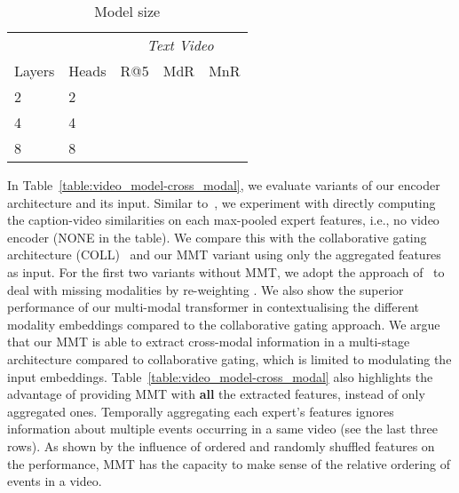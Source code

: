\documentclass[runningheads]{llncs}
\begin{document}
\begin{table}[t]
\begin{subtable}[t]{.5\linewidth}
        \label{table:video_model-initialisation}
  \end{subtable}\begin{subtable}[t]{.5\linewidth}
    \centering
        \caption{Model size}
        \begin{tabular}{l | l | @{\hskip -0.35cm}c @{\hskip -0.35cm}c @{\hskip -0.35cm}c}
        \hline
        \multicolumn{1}{c}{} & \multicolumn{1}{c}{} & \multicolumn{3}{c}{\textit{Text  Video}} \\
        Layers & Heads & R@5 & MdR & MnR \\
        \hline
        2 & 2 &  &  &  \\
        4 & 4 &  &  &  \\
        8 & 8 &  &  &  \\
        \hline
        \end{tabular}
        \label{table:video_model-model_size}
  \end{subtable}
  \label{table:video_model-ablations}
\end{table}

In Table~\ref{table:video_model-cross_modal}, we evaluate variants of our encoder architecture and its input. 
Similar to~\cite{miech2018learning}, we experiment with directly computing the caption-video similarities on each max-pooled expert features, i.e., no video encoder (NONE in the table). We compare this with the collaborative gating architecture (COLL)~\cite{liu2019use} and our MMT variant using only the aggregated features as input. For the first two variants without MMT, we adopt the approach of~\cite{miech2018learning} to deal with missing modalities by re-weighting . 
We also show the superior performance of our multi-modal transformer in contextualising the different modality embeddings compared to the collaborative gating approach. We argue that our MMT is able to extract cross-modal information in a multi-stage architecture compared to collaborative gating, which is limited to modulating the input embeddings. 
Table~\ref{table:video_model-cross_modal} also highlights the advantage of providing MMT with \textbf{all} the extracted features, instead of only  aggregated ones. 
Temporally aggregating each expert's features ignores information about multiple events occurring in a same video (see the last three rows). 
As shown by the influence of ordered and randomly shuffled features on the performance, MMT has the capacity to make sense of the relative ordering of events in a video.
\end{document}
